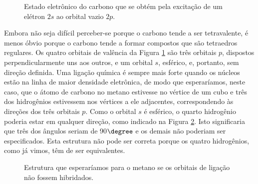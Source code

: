 \begin{figure}[H]
    \centering
    \caption{Estado eletrônico do carbono que se obtém pela excitação de um elétron $2s$ ao orbital vazio $2p$.}
    \label{figura_2_8}
\end{figure}

 Embora não seja difícil perceber-se porque o carbono tende a ser tetravalente, é menos óbvio porque o carbono tende a formar compostos que são tetraedros regulares. Os quatro orbitais de valência da Figura \ref{figura_2_8} são três orbitais $p$, dispostos perpendicularmente uns aos outros, e um orbital $s$, esférico, e, portanto, sem direção definida. Uma ligação química é sempre mais forte quando os núcleos estão na linha de maior densidade eletrônica, de modo que esperaríamos, neste caso, que o átomo de carbono no metano estivesse no vértice de um cubo e três dos hidrogênios estivessem nos vértices a ele adjacentes, correspondendo às direções dos três orbitais $p$. Como o orbital $s$ é esférico, o quarto hidrogênio poderia estar em qualquer direção, como indicado na Figura \ref{figura_2_9}. Isto significaria que três dos ângulos seriam de 90$\degree$ e os demais não poderiam ser especificados. Esta estrutura não pode ser correta porque os quatro hidrogênios, como já vimos, têm de ser equivalentes. 

\begin{figure}[H]
    \centering
    \caption{Estrutura que esperaríamos para o metano se os orbitais de ligação não fossem hibridados.}
    \label{figura_2_9}
\end{figure}

